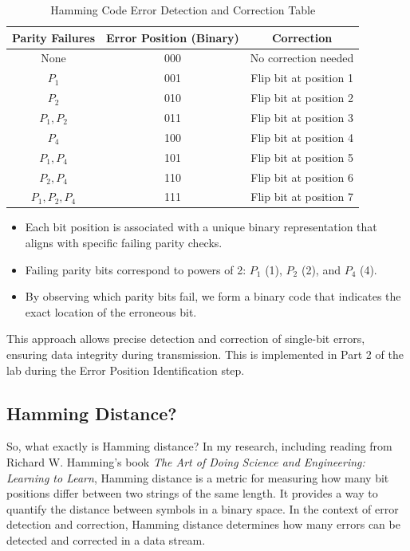 \documentclass[12pt]{article}
\begin{document}
\begin{table}[h!]
	\centering
	\renewcommand{\arraystretch}{1.3}
	\begin{tabular}{|c|c|c|}
		\hline
		\textbf{Parity Failures} & \textbf{Error Position (Binary)} & \textbf{Correction}    \\
		\hline
		None                     & 000                              & No correction needed   \\
		\hline
		\( P_1 \)                & 001                              & Flip bit at position 1 \\
		\hline
		\( P_2 \)                & 010                              & Flip bit at position 2 \\
		\hline
		\( P_1, P_2 \)           & 011                              & Flip bit at position 3 \\
		\hline
		\( P_4 \)                & 100                              & Flip bit at position 4 \\
		\hline
		\( P_1, P_4 \)           & 101                              & Flip bit at position 5 \\
		\hline
		\( P_2, P_4 \)           & 110                              & Flip bit at position 6 \\
		\hline
		\( P_1, P_2, P_4 \)      & 111                              & Flip bit at position 7 \\
		\hline
	\end{tabular}
	\caption{Hamming Code Error Detection and Correction Table}
\end{table}
\begin{itemize}
	\item Each bit position is associated with a unique binary representation that aligns with specific failing parity checks.
	\item Failing parity bits correspond to powers of 2: \( P_1 \) (1), \( P_2 \) (2), and \( P_4 \) (4).
	\item By observing which parity bits fail, we form a binary code that indicates the exact location of the erroneous bit.
\end{itemize}

This approach allows precise detection and correction of single-bit errors, ensuring data integrity during transmission. This is implemented in Part 2 of the lab during the Error Position Identification step.
\subsection*{Hamming Distance?}
So, what exactly is Hamming distance? In my research, including reading from Richard W. Hamming’s book \textit{The Art of Doing Science and Engineering: Learning to Learn}, Hamming distance is a metric for measuring how many bit positions differ between two strings of the same length. It provides a way to quantify the distance between symbols in a binary space. In the context of error detection and correction, Hamming distance determines how many errors can be detected and corrected in a data stream.
\end{document}
